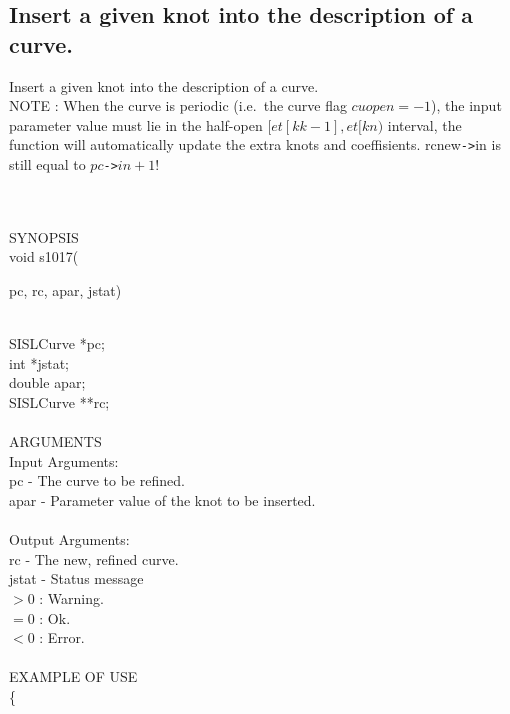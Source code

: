 \subsection{Insert a given knot into the description of a curve.}
\begin{minipg1}
  Insert a given knot into the description of a curve.\\
  NOTE       : When the curve is periodic (i.e.\ the curve flag
  $cuopen=-1$), the input parameter value must lie in the half-open
  $[et[kk-1], et[kn)$ interval, the function will automatically update
  the extra knots and  coeffisients. {\fov rcnew}{\tt ->}{\fov in} is
  still equal to  $pc${\tt ->}$in + 1$!
\end{minipg1} \\ \\
SYNOPSIS\\
        \>void s1017(\begin{minipg3}
          {\fov pc},  {\fov rc},  {\fov apar},  {\fov jstat})
        \end{minipg3}\\[0.3ex]
        \>\>    SISLCurve \> *{\fov pc};\\
        \>\>    int       \> *{\fov jstat};\\
        \>\>    double    \> {\fov apar};\\
        \>\>    SISLCurve \> **{\fov rc};\\
\\
ARGUMENTS\\
        \>Input Arguments:\\
        \>\>    {\fov pc}   \> - \> The curve to be refined.\\
        \>\>    {\fov apar} \> - \> Parameter value of the knot to be inserted.\\
\\
        \>Output Arguments:\\
        \>\>    {\fov rc}    \> - \> The new, refined curve.\\
        \>\>    {\fov jstat} \> - \> Status message\\
                      \>\>\>\>\> $> 0$ : Warning.\\
                      \>\>\>\>\> $= 0$ : Ok.\\
                      \>\>\>\>\> $< 0$ : Error.\\
\\
EXAMPLE OF USE\\
        \>      \{ \\
